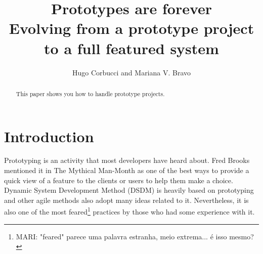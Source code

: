\documentclass[lnbip]{svmultln}
\newcommand{\mari}[1]{\footnote{MARI: #1}}
\begin{document}
%
\mainmatter              %
%
\title{Prototypes are forever\\
  Evolving from a prototype project to a full featured system}
%
%
\author{Hugo Corbucci and Mariana V. Bravo }
%
%
%

\maketitle              %

\begin{abstract}        %

This paper shows you how to handle prototype projects.

\end{abstract}
%
\section{Introduction}

Prototyping is an activity that most developers have heard about. Fred
Brooks mentioned it in The Mythical Man-Month \cite{Brooks1975} as one
of the best ways to provide a quick view of a feature to the clients
or users to help them make a choice. Dynamic System Development Method
(DSDM) is heavily based on prototyping and other agile methods also
adopt many ideas related to it. Nevertheless, it is also one of the
most feared\mari{"feared" parece uma palavra estranha, meio
  extrema... é isso mesmo?} practices by those who had some experience
with it.
\end{document}
